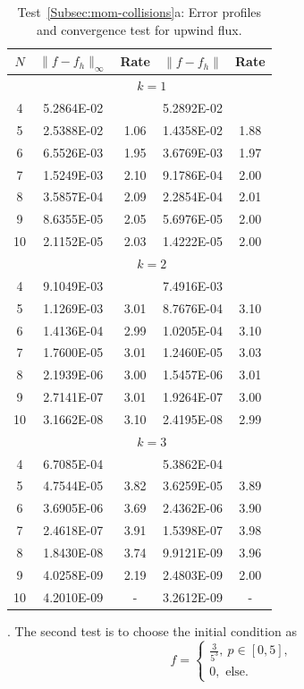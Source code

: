 \documentclass[preprint,11pt]{elsarticle}
\begin{document}
{\small
\begin{table}[H]
\caption{Test~\ref{Subsec:mom-collisions}a: Error profiles and convergence test for upwind flux.}\label{Tab:Mom-1}
\centering
\begin{tabular}{c|cc|cc}	\hline\hline
$N$ & $\|f-f_h\|_{\infty}$ & Rate & $\|f-f_h\|$ & Rate \\ \hline		
&\multicolumn{4}{c}{$k=1$}\\ \hline
4	&5.2864E-02	&		&5.2892E-02	&\\
5	&2.5388E-02	&1.06	&1.4358E-02	&1.88\\
6	&6.5526E-03	&1.95	&3.6769E-03	&1.97\\
7	&1.5249E-03	&2.10	&9.1786E-04	&2.00\\
8	&3.5857E-04	&2.09	&2.2854E-04	&2.01\\
9	&8.6355E-05	&2.05	&5.6976E-05	&2.00\\
10	&2.1152E-05	&2.03	&1.4222E-05	&2.00\\ \hline
&\multicolumn{4}{c}{$k=2$}\\ \hline		
4	&9.1049E-03	&		&7.4916E-03	&\\
5	&1.1269E-03	&3.01	&8.7676E-04	&3.10\\
6	&1.4136E-04	&2.99	&1.0205E-04	&3.10\\
7	&1.7600E-05	&3.01	&1.2460E-05	&3.03\\
8	&2.1939E-06	&3.00	&1.5457E-06	&3.01\\
9	&2.7141E-07	&3.01	&1.9264E-07	&3.00\\
10	&3.1662E-08	&3.10	&2.4195E-08	&2.99\\ \hline
&\multicolumn{4}{c}{$k=3$}\\ \hline				
4	&6.7085E-04	&		&5.3862E-04	&\\
5	&4.7544E-05	&3.82	&3.6259E-05	&3.89\\
6	&3.6905E-06	&3.69	&2.4362E-06	&3.90\\
7	&2.4618E-07	&3.91	&1.5398E-07	&3.98\\
8	&1.8430E-08	&3.74	&9.9121E-09	&3.96\\
9	&4.0258E-09	&2.19	&2.4803E-09	&2.00\\
10	&4.2010E-09	&-       	&3.2612E-09	&- \\ \hline
\hline
\end{tabular}
\end{table}
}

. The second test is to choose the initial condition as
$$
f = \begin{cases}
\frac{3}{5^3},\ p\in[0,5],\\
0,\text{ \ \ else}.
\end{cases}
$$
\end{document}
